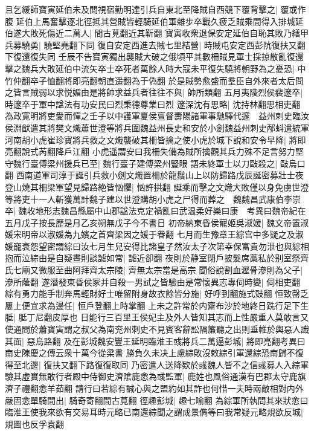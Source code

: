 且乞緩師寶寅延伯未及閲視宿勤明達引兵自東北至降賊自西競下覆背擊之|{
	覆或作腹}
延伯上馬奮擊逐北徑抵其營賊皆輕騎延伯軍雜步卒戰久疲乏賊乘間得入排城延伯遂大敗死傷近二萬人|{
	間古莧翻近其靳翻}
寶寅收衆退保安定延伯自恥其敗乃繕甲兵募驍勇|{
	驍堅堯翻下同}
復自安定西進去賊七里結營|{
	時賊屯安定西彭阬復扶又翻下復還復失同}
壬辰不告寶寅獨出襲賊大破之俄頃平其數柵賊見軍士採掠散亂復還擊之魏兵大敗延伯中流矢卒士卒死者萬餘人時大寇未平復失驍將朝野為之憂恐|{
	中竹仲翻卒子恤翻將即亮翻朝直遥翻為于偽翻}
於是賊勢愈盛而羣臣自外來者太后問之皆言賊弱以求悦媚由是將帥求益兵者往往不與|{
	帥所類翻}
五月夷陵烈侯裴邃卒|{
	時邃卒于軍中諡法有功安民曰烈秉德尊業曰烈}
邃深沈有思略|{
	沈持林翻思相吏翻}
為政寛明將吏愛而憚之壬子以中護軍夏侯亶督夀陽諸軍事馳驛代邃　益州刺史臨汝侯淵猷遣其將樊文熾蕭世澄等將兵圍魏益州長史和安於小劍魏益州刺史邴蚪遣統軍河南胡小虎崔珍寶將兵救之文熾襲破其柵皆擒之使小虎於城下說和安令早降|{
	將即亮翻說式芮翻降戶江翻}
小虎遥謂安曰我柵失備為賊所擒觀其兵力殊不足言努力堅守魏行臺傅梁州援兵已至|{
	魏行臺子建傅梁州豎眼}
語未終軍士以刀敺殺之|{
	敺烏口翻}
西南道軍司淳于誕引兵救小劍文熾置柵於龍鬚山上以防歸路戊辰誕密募壯士夜登山燒其柵梁軍望見歸路絶皆忷懼|{
	忷許拱翻}
誕乘而擊之文熾大敗僅以身免虜世澄等將吏十一人斬獲萬計魏子建以世澄購胡小虎之尸得而葬之　魏魏昌武康伯李崇卒|{
	魏收地形志魏昌縣屬中山郡諡法克定禍亂曰武温柔好樂曰康　考異曰魏帝紀在五月戊子按長歷是月乙亥朔無戊子今不書日}
初帝納東昏侯寵姬吳淑媛|{
	魏文帝置淑媛宋明帝以淑媛為九嬪之首齊梁因之媛于眷翻}
七月而生豫章王綜宫中多疑之及淑媛寵衰怨望密謂綜曰汝七月生兒安得比諸皇子然汝太子次第幸保富貴勿泄也與綜相抱而泣綜由是自疑晝則談謔如常|{
	謔近卻翻}
夜則於静室閉戶披髮席藁私於别室祭齊氏七廟又微服至曲阿拜齊太宗陵|{
	齊無太宗當是高宗}
聞俗說割血瀝骨滲則為父子|{
	滲所䕃翻}
遂潛發東昏侯冢并自殺一男試之皆驗由是常懷異志專伺時變|{
	伺相吏翻}
綜有勇力能手制奔馬輕財好士唯留附身故衣餘皆分施|{
	好呼到翻施式豉翻}
恒致罄乏屢上便宜求為邊任|{
	恒戶登翻上時掌翻}
上未之許常於内齋布沙於地終日跣行足下生胝|{
	胝丁尼翻皮厚也}
日能行三百里王侯妃主及外人皆知其志而上性嚴重人莫敢言又使通問於蕭寶寅謂之叔父為南兖州刺史不見賓客辭訟隔簾聽之出則垂帷於輿惡人識其面|{
	惡烏路翻}
及在彭城魏安豐王延明臨淮王彧將兵二萬逼彭城|{
	將即亮翻考異曰南史陳慶之傳云衆十萬今從梁書}
勝負久未决上慮綜敗沒敕綜引軍還綜恐南歸不復得至北邊|{
	復扶又翻下路復復取同}
乃密遣人送降欵於彧魏人皆不之信彧募人入綜軍驗其虛實無敢行者殿中侍御史濟隂鹿悆為彧監軍|{
	鹿姓也風俗通漢有巴郡太守鹿旗濟子禮翻悆羊茹翻}
請行曰若綜有誠心與之盟約如其詐也何惜一夫時兩敵相對内外嚴固悆單騎間出|{
	騎奇寄翻間古莧翻}
徑趣彭城|{
	趣七喻翻}
為綜軍所執問其來狀悆曰臨淮王使我來欲有交易耳時元略已南還綜聞之謂成景儁等曰我常疑元略規欲反城|{
	規圖也反孚袁翻}
